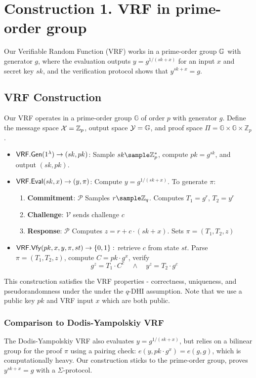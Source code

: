 \section{Construction 1. VRF in prime-order group}
Our Verifiable Random Function (VRF) works in a prime-order group $\mathbb{G}$ with generator $g$, where the evaluation outputs $y = g^{1/(sk + x)}$ for an input $x$ and secret key $sk$, and the verification protocol shows that $y^{sk + x} = g$.

\subsection{VRF Construction}
Our VRF operates in a prime-order group $\mathbb{G}$ of order $p$ with generator $g$. Define the message space $\mathcal{X} = \mathbb{Z}_p$, output space $\mathcal{Y} = \mathbb{G}$, and proof space $\Pi = \mathbb{G} \times \mathbb{G} \times \mathbb{Z}_p$. 
\begin{itemize}
    \item $\mathsf{VRF.Gen}(1^\lambda) \to (sk, pk)$:  
    Sample $sk \sample \mathbb{Z}_p^*$, compute $pk = g^{sk}$, and output $(sk, pk)$.
    \item $\mathsf{VRF.Eval}(sk, x) \to (y, \pi)$:  
    Compute $y = g^{1/(sk + x)}$.  
    To generate $\pi$:  
    \begin{enumerate}
        \item \textbf{Commitment}: $\mathcal{P}$ Samples $r \sample \Z_q$. Computes $T_1 = g^r$, $T_2 = y^r$
        \item \textbf{Challenge}: $\mathcal{V}$ sends challenge $c$
        \item \textbf{Response}: $\mathcal{P}$ Computes $z= r + c \cdot (sk + x)$. Sets $\pi = (T_1, T_2, z)$
    \end{enumerate}
    \item $\mathsf{VRF.Vfy}(pk, x, y, \pi, st) \to \{0,1\}:$ retrieve $c$ from state $st$. Parse $\pi = (T_1, T_2, z)$, compute $C = pk \cdot g^x$, verify
    \[
        g^z = T_1 \cdot C^c \quad \wedge \quad y^z = T_2 \cdot g^c
    \]
\end{itemize}
This construction satisfies the VRF properties - correctness, uniqueness, and pseudorandomness under the under the $q$-DHI assumption. Note that we use a public key $pk$ and VRF input $x$ which are both public. 

\subsubsection{Comparison to Dodis-Yampolskiy VRF}
The Dodis-Yampolskiy VRF also evaluates $y = g^{1/(sk + x)}$, but relies on a bilinear group for the proof $\pi$ using a pairing check: $e(y, pk \cdot g^x) = e(g, g)$, which is computationally heavy. Our construction sticks to the prime-order group, proves $y^{sk + x} = g$ with a $\Sigma$-protocol.






